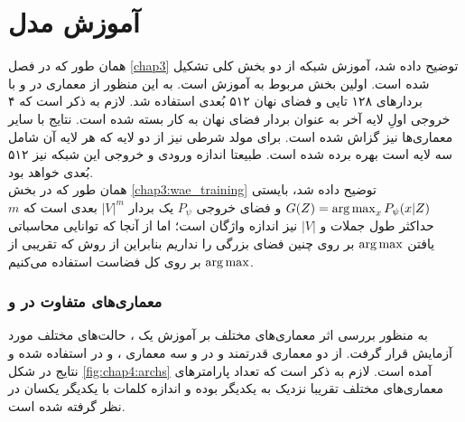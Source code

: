 \section{آموزش مدل}
همان طور که در فصل \ref{chap3} توضیح داده شد، آموزش شبکه از دو بخش کلی تشکیل شده است. اولین بخش مربوط به آموزش \wae{} است. به این منظور از معماری \transformer{}در \encoder{} و \decoder{} با بردارهای  \embedding{}
۱۲۸ تایی و فضای نهان ۵۱۲ بُعدی استفاده شد. لازم به ذکر است که ۴ خروجی اولِ لایه آخر \encoder{} به عنوان بردار فضای نهان به کار بسته شده است. نتایج با سایر معماری‌ها نیز گزاش شده‌ است. برای مولد شرطی نیز از دو لایه  که هر لایه آن شامل سه لایه  است بهره برده شده است. طبیعتا اندازه ورودی و خروجی این شبکه نیز ۵۱۲ بُعدی خواهد بود.
\\
همان طور که در بخش \ref{chap3:wae_training} توضیح داده شد، \decoder{} بایستی
$G(Z) = \operatorname*{arg\,max}_{x} P_\psi(x|Z)$
و فضای خروجی $P_\psi$ یک بردار $|V|^{m}$ بعدی است که $m$ حداکثر طول جملات و $|V|$ نیز اندازه واژگان است؛ اما از آنجا که توانایی محاسباتی یافتن $\operatorname*{arg\,max}$ بر روی چنین فضای بزرگی را نداریم بنابراین از روش
که تقریبی از $\operatorname*{arg\,max}$ بر روی کل فضاست استفاده می‌کنیم.

\subsubsection{معماری‌های متفاوت در \encoder{} و \decoder{}}
به منظور بررسی اثر معماری‌های مختلف بر آموزش یک \wae{}، حالت‌های مختلف مورد آزمایش قرار گرفت. از دو معماری قدرتمند \lstm{} و \transformer{} در \decoder{} و سه معماری \lstm{}، \cnn{}  و \transformer{} در \encoder{} استفاده شده و نتایج در شکل \ref{fig:chap4:archs} آمده است. لازم به ذکر است که تعداد پارامتر‌های معماری‌های مختلف تقریبا نزدیک به یکدیگر بوده و اندازه \embedding{} کلمات با یکدیگر یکسان در نظر گرفته شده است.

